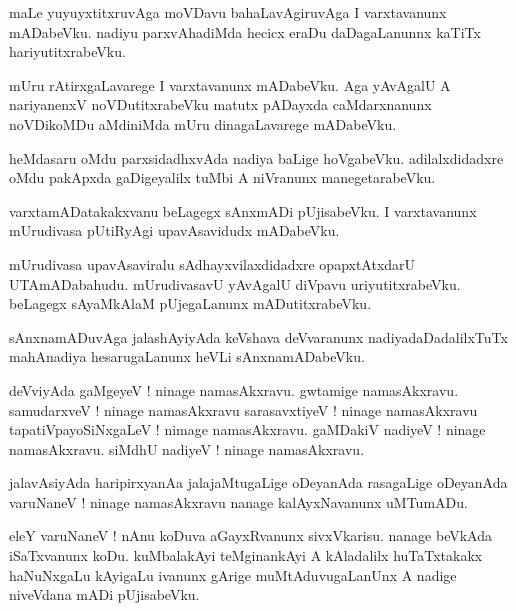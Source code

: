 \documentclass{article}
\begin{document}
\begin{mn}%
maLe yuyuyxtitxruvAga moVDavu bahaLavAgiruvAga I varxtavanunx mADabeVku. nadiyu parxvAhadiMda 
hecicx eraDu daDagaLanunnx kaTiTx hariyutitxrabeVku.
\end{mn}

\begin{mn}%
mUru rAtirxgaLavarege I varxtavanunx mADabeVku. Aga yAvAgalU A nariyanenxV noVDutitxrabeVku matutx 
pADayxda caMdarxnanunx noVDikoMDu aMdiniMda mUru dinagaLavarege mADabeVku.
\end{mn}

\begin{mn}%
heMdasaru oMdu parxsidadhxvAda nadiya baLige hoVgabeVku. adilalxdidadxre oMdu pakApxda gaDigeyalilx 
tuMbi A niVranunx manegetarabeVku.
\end{mn}

\begin{mn}%
varxtamADatakakxvanu beLagegx sAnxmADi pUjisabeVku. I varxtavanunx mUrudivasa pUtiRyAgi 
upavAsavidudx mADabeVku.
\end{mn}

\begin{mn}%
mUrudivasa upavAsaviralu sAdhayxvilaxdidadxre opapxtAtxdarU UTAmADabahudu. mUrudivasavU yAvAgalU 
diVpavu uriyutitxrabeVku. beLagegx sAyaMkAlaM pUjegaLanunx mADutitxrabeVku.
\end{mn}

\begin{mn}%
sAnxnamADuvAga jalashAyiyAda keVshava deVvaranunx nadiyadaDadalilxTuTx mahAnadiya hesarugaLanunx 
heVLi sAnxnamADabeVku.
\end{mn}

\begin{mn}%
deVviyAda gaMgeyeV ! ninage namasAkxravu. gwtamige namasAkxravu. samudarxveV ! ninage namasAkxravu 
sarasavxtiyeV ! ninage namasAkxravu tapatiVpayoSiNxgaLeV ! nimage namasAkxravu. gaMDakiV nadiyeV ! 
ninage namasAkxravu. siMdhU nadiyeV ! ninage namasAkxravu.
\end{mn}

\begin{mn}%
jalavAsiyAda haripirxyanAa jalajaMtugaLige oDeyanAda rasagaLige oDeyanAda varuNaneV ! ninage 
namasAkxravu nanage kalAyxNavanunx uMTumADu.
\end{mn}

\begin{mn}%
eleY varuNaneV ! nAnu koDuva aGayxRvanunx sivxVkarisu. nanage beVkAda iSaTxvanunx koDu. kuMbalakAyi 
teMginankAyi A kAladalilx huTaTxtakakx haNuNxgaLu kAyigaLu ivanunx gArige muMtAduvugaLanUnx A 
nadige niveVdana mADi pUjisabeVku.
\end{mn}
\end{document}
